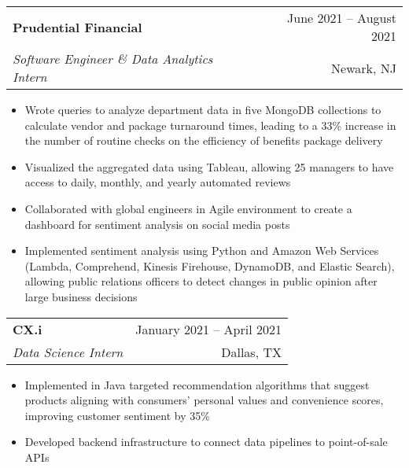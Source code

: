 \documentclass[letterpaper,11pt]{article}
\makeatletter
\newcommand{\myuline}[1]{%
  \uline{\phantom{#1}}%
  \llap{\contour{white}{#1}}%
}
\newcommand{\resumeItem}[1]{
  \item\small{
    {#1 \vspace{-1pt}}
  }
}
\newcommand{\resumeSubheading}[4]{
  \vspace{-1pt}\item
    \begin{tabular*}{\textwidth}[t]{l@{\extracolsep{\fill}}r}
      \textbf{#1} & {\color{dark-grey}\small #2}\vspace{1pt}\\ %
      \textit{#3} & {\color{dark-grey} \small #4}\\ %
    \end{tabular*}\vspace{-4pt}
}
\newcommand{\resumeItemListStart}{\begin{itemize}}
\newcommand{\resumeItemListEnd}{\end{itemize}\vspace{0pt}}
\makeatother
\begin{document}
    \resumeSubheading
      {Prudential Financial}{June 2021 -- August 2021}
      {Software Engineer \& Data Analytics Intern}{Newark, NJ}
      \resumeItemListStart
        \resumeItem{Wrote queries to analyze department data in five MongoDB collections to calculate vendor and package turnaround times, leading to a 33\% increase in the number of routine checks on the efficiency of benefits package delivery}
        \resumeItem{Visualized the aggregated data using Tableau, allowing 25 managers to have access to daily, monthly, and yearly automated reviews}
         \resumeItem{Collaborated with global engineers in Agile environment to create a dashboard for sentiment analysis on social media posts}
         \resumeItem{Implemented sentiment analysis using Python and Amazon Web Services (Lambda, Comprehend, Kinesis Firehouse, DynamoDB, and Elastic Search), allowing public relations officers to detect changes in public opinion after large business decisions
         }
      \resumeItemListEnd
      
          \resumeSubheading
      {CX.i}{January 2021 -- April 2021}
      {Data Science Intern}{Dallas, TX}
      \resumeItemListStart
        \resumeItem{Implemented in Java targeted recommendation algorithms that suggest products aligning with consumers' personal values and convenience scores, improving customer sentiment by 35\%}
        \resumeItem{Developed backend infrastructure to connect data pipelines to point-of-sale APIs}

    \resumeItemListEnd
\end{document}
